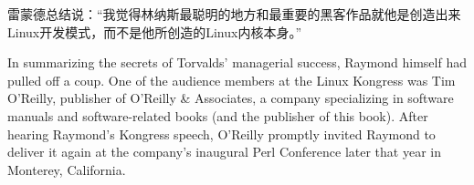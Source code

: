 \ifdefined\chs
雷蒙德总结说：``我觉得林纳斯最聪明的地方和最重要的黑客作品就他是创造出来Linux开发模式，而不是他所创造的Linux内核本身。''
\fi




\ifdefined\eng
In summarizing the secrets of Torvalds' managerial success, Raymond himself had pulled off a coup. One of the audience members at the Linux Kongress was Tim O'Reilly, publisher of O'Reilly \& Associates, a company specializing in software manuals and software-related books (and the publisher of this book). After hearing Raymond's Kongress speech, O'Reilly promptly invited Raymond to deliver it again at the company's inaugural Perl Conference later that year in Monterey, California.
\fi

